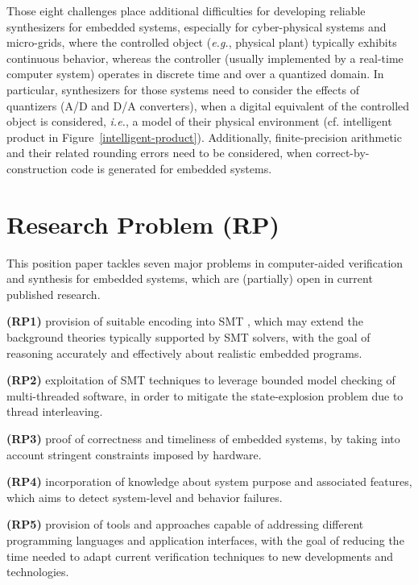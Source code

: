 \documentclass{acm_sen_article}
\begin{document}
Those eight challenges place additional difficulties for developing reliable synthesizers for embedded systems, especially for cyber-physical systems and micro-grids, where the controlled object ({\it e.g.}, physical plant) typically exhibits continuous behavior, whereas the controller (usually implemented by a real-time computer system) operates in discrete time and over a quantized domain. In particular, synthesizers for those systems need to consider the effects of quantizers (A/D and D/A converters), when a digital equivalent of the controlled object is considered, {\it i.e.}, a model of their physical environment (cf. intelligent product in Figure~\ref{intelligent-product}). Additionally,  finite-precision arithmetic and their related rounding errors need to be considered, when correct-by-construction code is generated for embedded systems.

\section{Research Problem (RP)}
\label{Research-Problem}

This position paper tackles seven major problems in computer-aided verification and synthesis for embedded systems, which are (partially) open in current published research.

\textbf{(RP1)} provision of suitable encoding into SMT \cite{BarrettSST09}, which may extend the background theories typically supported by SMT solvers, with the goal of reasoning accurately and effectively about realistic embedded programs.

\textbf{(RP2)} exploitation of SMT techniques to leverage bounded model checking of multi-threaded software, in order to mitigate the state-explosion problem due to thread interleaving.
	
\textbf{(RP3)} proof of correctness and timeliness of embedded systems, by taking into account stringent constraints imposed by hardware.
	
\textbf{(RP4)} incorporation of knowledge about system purpose and associated features, which aims to detect system-level and behavior failures.

\textbf{(RP5)} provision of tools and approaches capable of addressing different programming languages and application interfaces, with the goal of reducing the time needed to adapt current verification techniques to new developments and technologies.
\end{document}
